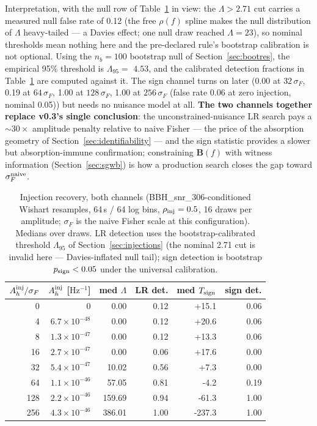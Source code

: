 \documentclass[11pt]{article}
\newcommand{\Ah}{A_h}
\begin{document}
Interpretation, with the null row of Table~\ref{tab:inj} in view: the $\Lambda > 2.71$ cut carries a measured null false rate of 0.12 (the free $\rho(f)$ spline makes the null distribution of $\Lambda$ heavy-tailed --- a Davies effect; one null draw reached $\Lambda = 23$), so nominal thresholds mean nothing here and the pre-declared rule's bootstrap calibration is not optional. Using the $n_b = 100$ bootstrap null of Section~\ref{sec:bootres}, the empirical 95\% threshold is $\Lambda_{95} = $ $4.53$, and the calibrated detection fractions in Table~\ref{tab:inj} are computed against it. The sign channel turns on later (0.00 at $32\,\sigma_F$, 0.19 at $64\,\sigma_F$, 1.00 at $128\,\sigma_F$, 1.00 at $256\,\sigma_F$ (false rate 0.06 at zero injection, nominal 0.05)) but needs no nuisance model at all. \textbf{The two channels together replace v0.3's single conclusion}: the unconstrained-nuisance LR search pays a $\sim$$30\times$ amplitude penalty relative to naive Fisher --- the price of the absorption geometry of Section~\ref{sec:identifiability} --- and the sign statistic provides a slower but absorption-immune confirmation; constraining $\mathbf{B}(f)$ with witness information (Section~\ref{sec:sgwb}) is how a production search closes the gap toward $\sigma_F^{\rm naive}$.

\begin{table}[t]
\centering
\caption{Injection recovery, both channels (BBH\_snr\_306-conditioned Wishart resamples, 64\,s / 64 log bins, $\rho_{\rm inj}=0.5$, 16 draws per amplitude; $\sigma_F$ is the naive Fisher scale at this configuration). Medians over draws. LR detection uses the bootstrap-calibrated threshold $\Lambda_{95}$ of Section~\ref{sec:injections} (the nominal 2.71 cut is invalid here --- Davies-inflated null tail); sign detection is bootstrap $p_{\rm sign} < 0.05$ under the universal calibration.}
\label{tab:inj}
\begin{tabular}{rrrrrr}
\toprule
$\Ah^{\rm inj}/\sigma_F$ & $\Ah^{\rm inj}$ [$\mathrm{Hz^{-1}}$] & med $\Lambda$ & LR det. & med $T_{\rm sign}$ & sign det. \\
\midrule
0 & $0$ & 0.00 & 0.12 & +15.1 & 0.06 \\
4 & $6.7\times10^{-48}$ & 0.00 & 0.12 & +20.6 & 0.06 \\
8 & $1.3\times10^{-47}$ & 0.00 & 0.12 & +13.3 & 0.06 \\
16 & $2.7\times10^{-47}$ & 0.00 & 0.06 & +17.6 & 0.00 \\
32 & $5.4\times10^{-47}$ & 10.02 & 0.56 & +7.3 & 0.00 \\
64 & $1.1\times10^{-46}$ & 57.05 & 0.81 & -4.2 & 0.19 \\
128 & $2.2\times10^{-46}$ & 159.69 & 0.94 & -61.3 & 1.00 \\
256 & $4.3\times10^{-46}$ & 386.01 & 1.00 & -237.3 & 1.00 \\
\bottomrule
\end{tabular}
\end{table}
\end{document}
